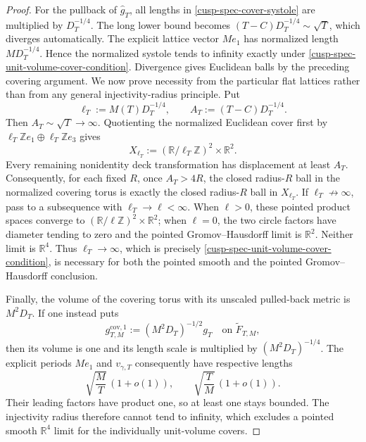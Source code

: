 \begin{proof}
For the pullback of \(\widehat g_T\), all lengths in
\cref{cusp-spec-cover-systole} are multiplied by \(D_T^{-1/4}\).  The long
lower bound becomes
\((T-C)D_T^{-1/4}\sim\sqrt T\), which diverges automatically.  The explicit
lattice vector \(Me_1\) has normalized length \(MD_T^{-1/4}\).  Hence the
normalized systole tends to infinity exactly under
\cref{cusp-spec-unit-volume-cover-condition}.  Divergence gives Euclidean
balls by the preceding covering argument.  We now prove necessity from the
particular flat lattices rather than from any general injectivity-radius
principle.  Put
\[
 \ell_T:=M(T)D_T^{-1/4},
 \qquad A_T:=(T-C)D_T^{-1/4}.
\]
Then \(A_T\sim\sqrt T\to\infty\).  Quotienting the normalized Euclidean
cover first by
\(\ell_T\mathbb Ze_1\oplus\ell_T\mathbb Ze_3\) gives
\[
 X_{\ell_T}:=
 (\mathbb R/\ell_T\mathbb Z)^2\times\mathbb R^2.
\]
Every remaining nonidentity deck transformation has displacement at least
\(A_T\).  Consequently, for each fixed \(R\), once \(A_T>4R\), the
closed radius-\(R\) ball in the normalized covering torus is exactly the
closed radius-\(R\) ball in \(X_{\ell_T}\).  If
\(\ell_T\not\to\infty\), pass to a subsequence with
\(\ell_T\to\ell<\infty\).  When \(\ell>0\), these pointed product spaces
converge to
\((\mathbb R/\ell\mathbb Z)^2\times\mathbb R^2\); when \(\ell=0\),
the two circle factors have diameter tending to zero and the pointed
Gromov--Hausdorff limit is \(\mathbb R^2\).  Neither limit is
\(\mathbb R^4\).  Thus \(\ell_T\to\infty\), which is precisely
\cref{cusp-spec-unit-volume-cover-condition}, is necessary for both the
pointed smooth and the pointed Gromov--Hausdorff conclusion.

Finally, the volume of the covering torus with its unscaled pulled-back metric
is \(M^2D_T\).  If one instead puts
\begin{equation}
 g^{\mathrm{cov},1}_{T,M}:=(M^2D_T)^{-1/2}g_T
 \quad\text{on }\widetilde F_{T,M},
 \label{cusp-spec-cover-own-unit-volume-metric}
\end{equation}
then its volume is one and its length scale is multiplied by
\((M^2D_T)^{-1/4}\).  The explicit periods \(Me_1\) and
\(v_{\gamma,T}\) consequently have respective lengths
\begin{equation}
 \sqrt{\frac{M}{T}}\,(1+o(1)),
 \qquad
 \sqrt{\frac{T}{M}}\,(1+o(1)).
 \label{cusp-spec-cover-own-unit-volume-lengths}
\end{equation}
Their leading factors have product one, so at least one stays bounded.  The
injectivity radius therefore cannot tend to infinity, which excludes a
pointed smooth \(\mathbb R^4\) limit for the individually unit-volume covers.
\end{proof}

